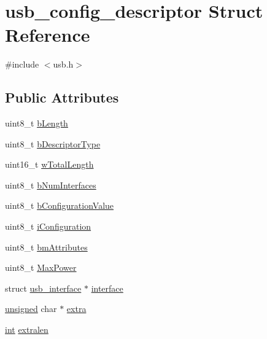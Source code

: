 \hypertarget{structusb__config__descriptor}{\section{usb\-\_\-config\-\_\-descriptor Struct Reference}
\label{structusb__config__descriptor}
}


{\ttfamily \#include $<$usb.\-h$>$}

\subsection*{Public Attributes}
\begin{DoxyCompactItemize}
\item 
uint8\-\_\-t \hyperlink{structusb__config__descriptor_aaa38eade89cca96312968258eaeade9d}{b\-Length}
\item 
uint8\-\_\-t \hyperlink{structusb__config__descriptor_a69b0a0fe8f2f9152f299a333f352982e}{b\-Descriptor\-Type}
\item 
uint16\-\_\-t \hyperlink{structusb__config__descriptor_a09fb7940f26366f7f0aedb496a18b97c}{w\-Total\-Length}
\item 
uint8\-\_\-t \hyperlink{structusb__config__descriptor_a712744e37c3759b311131278ec2cf074}{b\-Num\-Interfaces}
\item 
uint8\-\_\-t \hyperlink{structusb__config__descriptor_af50d14a1e97dab1a4483f03b969ca431}{b\-Configuration\-Value}
\item 
uint8\-\_\-t \hyperlink{structusb__config__descriptor_ace6c0975162873b87744269bd188d297}{i\-Configuration}
\item 
uint8\-\_\-t \hyperlink{structusb__config__descriptor_aa46182c4bc520e2c60a83c84d80d1e23}{bm\-Attributes}
\item 
uint8\-\_\-t \hyperlink{structusb__config__descriptor_a3ff6bd15942a15e5a316ef57445856dd}{Max\-Power}
\item 
struct \hyperlink{structusb__interface}{usb\-\_\-interface} $\ast$ \hyperlink{structusb__config__descriptor_aaa9efa2b6e119235e53db64bf6976e48}{interface}
\item 
\hyperlink{curses_8priv_8h_aca40206900cfc164654362fa8d4ad1e6}{unsigned} char $\ast$ \hyperlink{structusb__config__descriptor_ad5aac330e09cd33f5483111f128f93d1}{extra}
\item 
\hyperlink{term__entry_8h_ad65b480f8c8270356b45a9890f6499ae}{int} \hyperlink{structusb__config__descriptor_aae00d0a5a1cb85783feb0fb1c76f1efc}{extralen}
\end{DoxyCompactItemize}


